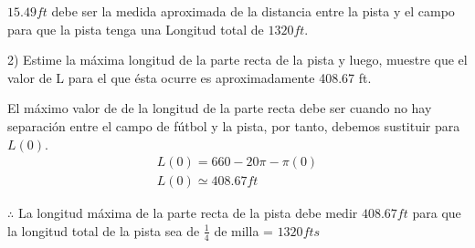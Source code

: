 $15.49ft$ debe ser la medida aproximada de la distancia entre la pista y el campo para que la pista tenga una Longitud total de $1320ft$.
\vspace*{0.2cm}


2) Estime la máxima longitud de la parte recta de la pista y luego, muestre que el valor de L para el que ésta ocurre es aproximadamente 408.67 ft.

El máximo valor de de la longitud de la parte recta debe ser cuando no hay separación entre el campo de fútbol y la pista, por tanto, debemos sustituir para $ L(0)$.
\begin{gather*}
    L(0)=660 - 20\pi-\pi(0)\\
    L(0)\simeq 408.67ft
\end{gather*}

$\therefore$ La longitud máxima de la parte recta de la pista debe medir $408.67ft$ para que la longitud total de la pista sea de $\frac{1}{4}$ de milla = $1320 fts$